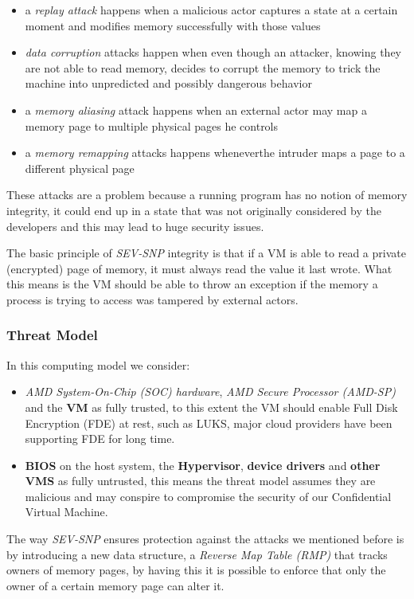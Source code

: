 \documentclass[twocolumn]{article}
\begin{document}
\begin{itemize}
    \item a \textit{replay attack} happens when a malicious actor captures a state at a certain moment and modifies memory successfully with those values
    \item \textit{data corruption} attacks happen when even though an attacker, knowing they are not able to read memory, decides to corrupt the memory to trick the machine into unpredicted and possibly dangerous behavior
    \item a \textit{memory aliasing} attack happens when an external actor may map a memory page to multiple physical pages he controls
    \item a \textit{memory remapping} attacks happens wheneverthe intruder maps a page to a different physical page
\end{itemize}

These attacks are a problem because a running program has no notion of memory integrity, it could end up in a state that was not originally considered by the developers and this may lead to huge security issues.

The basic principle of \textit{SEV-SNP} integrity is that if a VM is able to read a private (encrypted) page of memory, it must always read the value it last wrote. What this means is the VM should be able to throw an exception if the memory a process is trying to access was tampered by external actors.

\subsubsection{Threat Model}
In this computing model we consider:
\begin{itemize}
    \item \textit{AMD System-On-Chip (SOC) hardware}, \textit{AMD Secure Processor (AMD-SP)} and the \textbf{VM} as fully trusted, to this extent the VM should enable Full Disk Encryption (FDE) at rest, such as LUKS, major cloud providers have been supporting FDE for long time.
    \item \textbf{BIOS} on the host system, the \textbf{Hypervisor}, \textbf{device drivers} and \textbf{other VMS} as fully untrusted, this means the threat model assumes they are malicious and may conspire to compromise the security of our Confidential Virtual Machine.
\end{itemize}

The way \textit{SEV-SNP} ensures protection against the attacks we mentioned before is by introducing a new data structure, a \textit{Reverse Map Table (RMP)} that tracks owners of memory pages, by having this it is possible to enforce that only the owner of a certain memory page can alter it.
\end{document}
